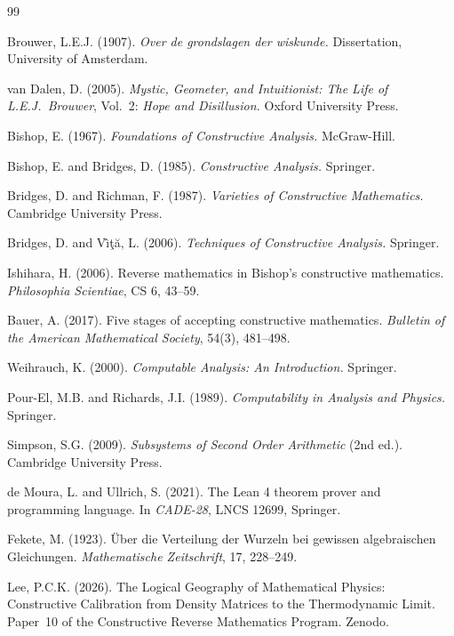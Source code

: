 \documentclass[11pt,a4paper]{report}
\theoremstyle{plain}
\theoremstyle{definition}
\theoremstyle{remark}
\begin{document}
\begin{thebibliography}{99}

 Brouwer, L.E.J. (1907). \emph{Over de grondslagen der wiskunde.} Dissertation, University of Amsterdam.

 van Dalen, D. (2005). \emph{Mystic, Geometer, and Intuitionist: The Life of L.E.J.\ Brouwer}, Vol.~2: \emph{Hope and Disillusion.} Oxford University Press.

 Bishop, E. (1967). \emph{Foundations of Constructive Analysis.} McGraw-Hill.

 Bishop, E. and Bridges, D. (1985). \emph{Constructive Analysis.} Springer.

 Bridges, D. and Richman, F. (1987). \emph{Varieties of Constructive Mathematics.} Cambridge University Press.

 Bridges, D. and V\^{\i}\c{t}\u{a}, L. (2006). \emph{Techniques of Constructive Analysis.} Springer.

 Ishihara, H. (2006). Reverse mathematics in Bishop's constructive mathematics. \emph{Philosophia Scientiae}, CS 6, 43--59.

 Bauer, A. (2017). Five stages of accepting constructive mathematics. \emph{Bulletin of the American Mathematical Society}, 54(3), 481--498.

 Weihrauch, K. (2000). \emph{Computable Analysis: An Introduction.} Springer.

 Pour-El, M.B. and Richards, J.I. (1989). \emph{Computability in Analysis and Physics.} Springer.

 Simpson, S.G. (2009). \emph{Subsystems of Second Order Arithmetic} (2nd ed.). Cambridge University Press.

 de Moura, L. and Ullrich, S. (2021). The Lean 4 theorem prover and programming language. In \emph{CADE-28}, LNCS 12699, Springer.

 Fekete, M. (1923). \"Uber die Verteilung der Wurzeln bei gewissen algebraischen Gleichungen. \emph{Mathematische Zeitschrift}, 17, 228--249.

 Lee, P.C.K. (2026). The Logical Geography of Mathematical Physics: Constructive Calibration from Density Matrices to the Thermodynamic Limit. Paper~10 of the Constructive Reverse Mathematics Program. Zenodo.


\end{thebibliography}
\end{document}
